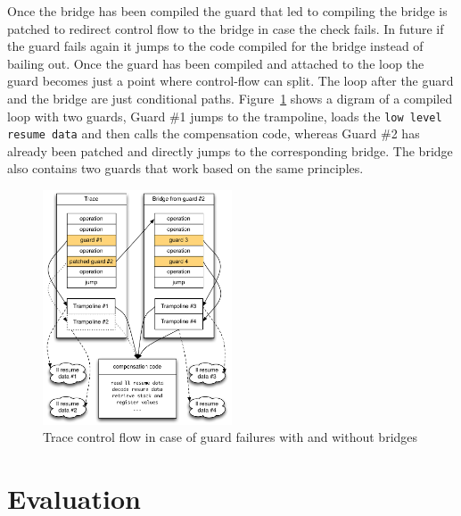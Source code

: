 \documentclass[10pt,preprint]{sigplanconf}
\begin{document}
Once the bridge has been compiled the guard that led to compiling the bridge is
patched to redirect control flow to the bridge in case the check fails. In
future if the guard fails again it jumps to the code compiled for the bridge
instead of bailing out. Once the guard has been compiled and attached to the
loop the guard becomes just a point where control-flow can split. The loop
after the guard and the bridge are just conditional paths.
Figure~\ref{fig:trampoline} shows a digram of a compiled loop with two guards,
Guard \#1 jumps to the trampoline, loads the \texttt{low level resume data} and
then calls the compensation code, whereas Guard \#2 has already been patched
and directly jumps to the corresponding bridge. The bridge also contains two
guards that work based on the same principles.
\begin{figure}
\centering
\includegraphics[width=0.5\textwidth]{figures/loop_bridge.pdf}
\caption{Trace control flow in case of guard failures with and without bridges}
\label{fig:trampoline}
\end{figure}
%



\section{Evaluation}
\label{sec:evaluation}
\end{document}
